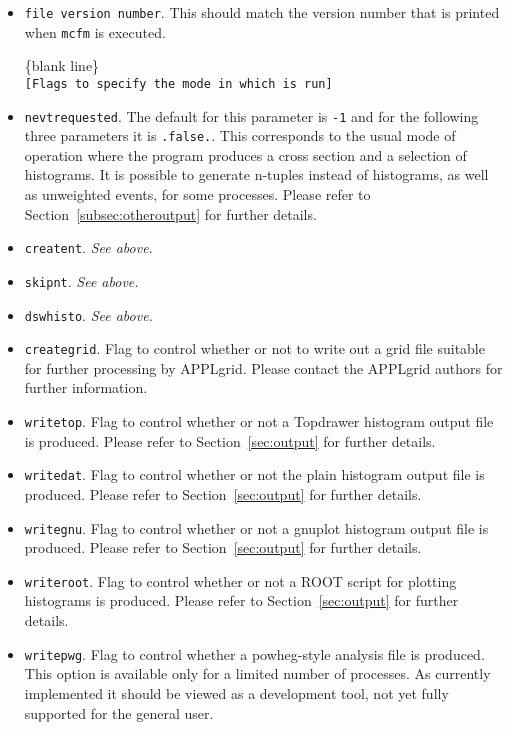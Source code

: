 \documentclass[12pt]{article}
\begin{document}
\begin{itemize}
\item {\tt file version number}. This should match the version number
that is printed when {\tt mcfm} is executed.

\begin{center}
\{blank line\} \\
{\tt [Flags to specify the mode in which \MCFM is run] }
\end{center}

\item {\tt nevtrequested}. The default for this parameter is {\tt -1} and for the following three
parameters it is {\tt .false.}.  This corresponds to the usual mode
of operation where the program produces a cross section and a selection of histograms.
It is possible to generate n-tuples instead of histograms,
as well as unweighted events, for some processes. Please refer to
Section~\ref{subsec:otheroutput} for further details.
\item {\tt creatent}. {\it See above.}
\item {\tt skipnt}. {\it See above.}
\item {\tt dswhisto}. {\it See above.}
\item {\tt creategrid}. Flag to control whether or not to write out a grid file suitable for
further processing by APPLgrid.  Please contact the APPLgrid authors for further information.
\item {\tt writetop}. Flag to control whether or not a Topdrawer histogram output file
is produced. Please refer to Section~\ref{sec:output} for further details.
\item {\tt writedat}. Flag to control whether or not the plain histogram output file
is produced. Please refer to Section~\ref{sec:output} for further details.
\item {\tt writegnu}. Flag to control whether or not a gnuplot histogram output file
is produced. Please refer to Section~\ref{sec:output} for further details.
\item {\tt writeroot}. Flag to control whether or not a ROOT script for plotting
histograms is produced. Please refer to Section~\ref{sec:output} for further details.
\item {\tt writepwg}. Flag to control whether a powheg-style analysis file is produced.
This option is available only for a limited number of processes. As currently implemented it
should be viewed as a development tool, not yet fully supported for the general user.


\end{itemize}
\end{document}
